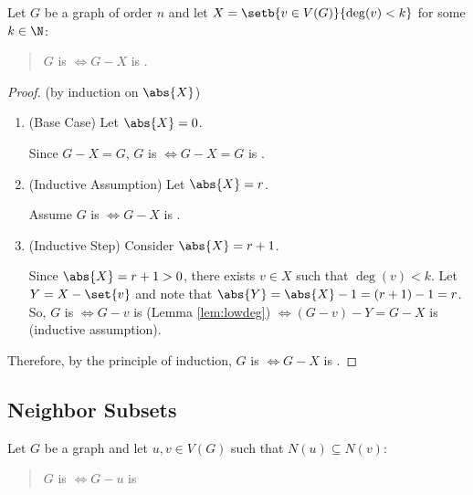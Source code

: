 \begin{corollary}
  \label{cor:lowdeg}
  Let \(G\) be a graph of order \(n\) and let \(X=\setb{v\in V(G)}{\deg(v)<k}\) for some \(k\in\N\):
  \begin{quote}
    \(G\) is  \(\iff G-X\) is .
  \end{quote}
\end{corollary}

\begin{proof}
  (by induction on \(\abs{X}\))
  \begin{enumerate}
  \item (Base Case) Let \(\abs{X}=0\).

    Since \(G-X=G\), \(G\) is  \(\iff G-X=G\) is .

  \item (Inductive Assumption) Let \(\abs{X}=r\).

    Assume \(G\) is  \(\iff G-X\) is .

  \item (Inductive Step) Consider \(\abs{X}=r+1\).
    
    Since \(\abs{X}=r+1>0\), there exists \(v\in X\) such that \(\deg(v)<k\).  Let \(Y=X-\set{v}\) and note that
    \(\abs{Y}=\abs{X}-1=(r+1)-1=r\).  So, \(G\) is  \(\iff G-v\) is  (Lemma \ref{lem:lowdeg}) \(\iff
    (G-v)-Y=G-X\) is  (inductive assumption).
  \end{enumerate}

  Therefore, by the principle of induction, \(G\) is  \(\iff G-X\) is .
\end{proof}

\subsection{Neighbor Subsets}

\begin{lemma}
  \label{lem:subset}
  Let \(G\) be a graph and let \(u,v\in V(G)\) such that \(N(u)\subseteq N(v)\):
  \begin{quote}
    \(G\) is  \(\iff G-u\) is 
  \end{quote}
\end{lemma}

